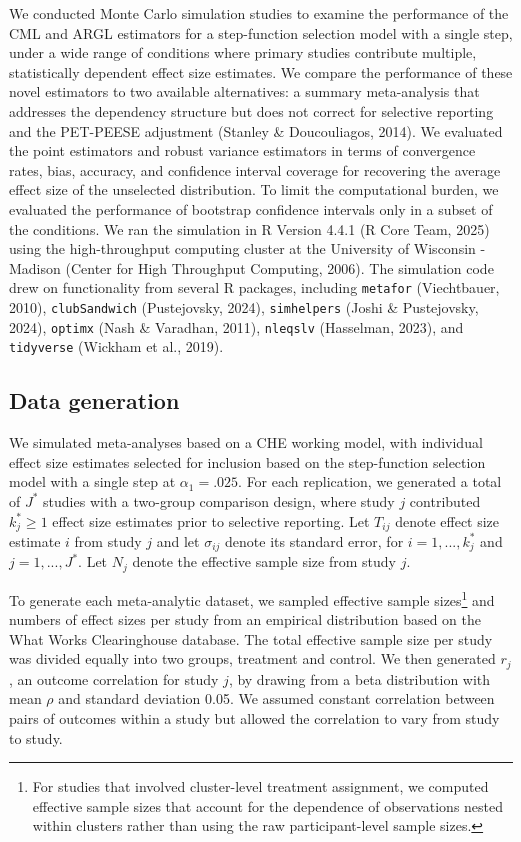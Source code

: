 \documentclass[
  american,
  man, donotrepeattitle,floatsintext]{apa7}
\begin{document}
We conducted Monte Carlo simulation studies to examine the performance
of the CML and ARGL estimators for a step-function selection model with a single step, under a wide range of conditions where primary studies contribute multiple, statistically dependent effect size estimates.
We compare the performance of these novel estimators to two available alternatives: a summary meta-analysis that addresses the dependency structure but does not correct for selective reporting and the PET-PEESE adjustment (Stanley \& Doucouliagos, 2014).
We evaluated the point estimators and robust variance estimators in terms of convergence rates, bias, accuracy, and confidence interval coverage for recovering the average effect size of the unselected distribution.
To limit the computational burden, we evaluated the performance of bootstrap confidence intervals only in a subset of the conditions.
We ran the simulation in R Version 4.4.1
(R Core Team, 2025) using the high-throughput computing cluster at the University of Wisconsin - Madison (Center for High Throughput Computing, 2006).
The simulation code drew on functionality from several R packages, including \texttt{metafor} (Viechtbauer, 2010), \texttt{clubSandwich} (Pustejovsky, 2024), \texttt{simhelpers} (Joshi \& Pustejovsky, 2024), \texttt{optimx} (Nash \& Varadhan, 2011), \texttt{nleqslv} (Hasselman, 2023), and \texttt{tidyverse} (Wickham et al., 2019).

\subsection{Data generation}\label{data-generation}

We simulated meta-analyses based on a CHE working model, with individual effect size estimates selected
for inclusion based on the step-function selection model with a single step at \(\alpha_1 = .025\).
For each replication, we generated a total of \(J^*\) studies with a two-group comparison
design, where study \(j\) contributed \(k_j^* \geq 1\) effect size estimates prior to selective reporting. Let
\(T_{ij}\) denote effect size estimate \(i\) from study \(j\) and let \(\sigma_{ij}\)
denote its standard error, for \(i = 1,...,k_j^*\) and \(j = 1,...,J^*\). Let \(N_j\)
denote the effective sample size from study \(j\).

To generate each meta-analytic dataset, we sampled effective sample sizes\footnote{For studies that involved cluster-level treatment assignment, we computed effective sample sizes that account for the dependence of observations nested within clusters rather than using the raw participant-level sample sizes.} and numbers of effect sizes per study from an empirical distribution based on the What Works Clearinghouse database.
The total effective sample size per study was divided equally into two groups, treatment and control.
We then generated \(r_j\), an outcome correlation for study \(j\), by drawing from a beta distribution with mean \(\rho\) and standard deviation 0.05.
We assumed constant correlation between pairs of outcomes within a study but allowed the correlation to vary from study to study.
\end{document}
